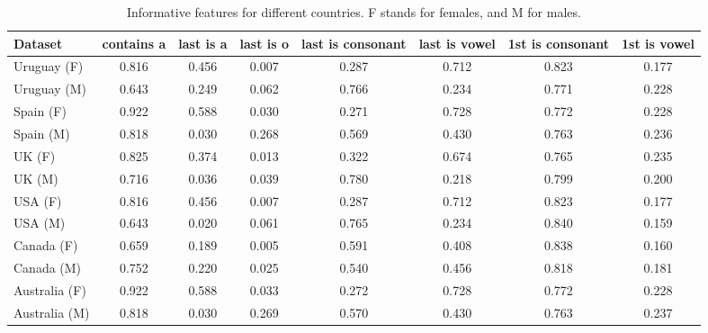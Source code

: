 \documentclass[a4paper]{article}
\begin{document}
\begin{table*}
\footnotesize
\center
\begin{tabular}[]{lccccccc}
  \hline
Dataset & contains a & last is a & last is o & last is consonant & last is vowel & 1st is consonant & 1st is vowel  \tabularnewline
  \hline
 Uruguay (F) &    0.816 &         0.456 &         0.007 &                 0.287 &             0.712 &                  0.823 &              0.177  \tabularnewline
 Uruguay (M) &    0.643 &         0.249 &         0.062 &                 0.766 &             0.234 &                  0.771 &              0.228  \tabularnewline
 Spain (F)   &    0.922 &         0.588 &          0.030 &                 0.271 &             0.728 &                  0.772 &              0.228  \tabularnewline
 Spain (M)   &    0.818 &          0.030 &         0.268 &                 0.569 &              0.430 &                  0.763 &              0.236  \tabularnewline
 UK (F)      &    0.825 &         0.374 &         0.013 &                 0.322 &             0.674 &                  0.765 &              0.235  \tabularnewline
 UK (M)      &    0.716 &         0.036 &         0.039 &                  0.780 &             0.218 &                  0.799 &                0.200  \tabularnewline
 USA (F)     &    0.816 &         0.456 &         0.007 &                 0.287 &             0.712 &                  0.823 &              0.177  \tabularnewline
 USA (M)     &    0.643 &          0.020 &         0.061 &                 0.765 &             0.234 &                   0.840 &              0.159  \tabularnewline
 Canada (F)  &    0.659 &         0.189 &         0.005 &                 0.591 &             0.408 &                  0.838 &              0.160  \tabularnewline
 Canada (M)  &    0.752 &          0.220 &         0.025 &                  0.540 &             0.456 &                  0.818 &              0.181  \tabularnewline
Australia (F)      &    0.922 &         0.588 &         0.033 &                 0.272 &             0.728 &                  0.772 &              0.228 \tabularnewline
 Australia (M)        &    0.818 &          0.030 &         0.269 &                  0.570 &              0.430 &                  0.763 &              0.237 \tabularnewline
 
\hline
\end{tabular}
\caption{Informative features for different countries. F stands for females, and M for males.}
\vspace{0.3cm}
\label{table:InfoFeatures}
\end{table*}
\end{document}
